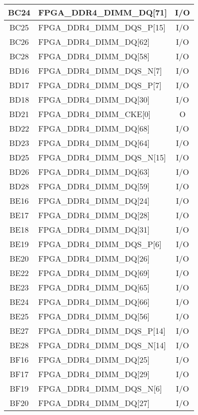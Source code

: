 \begin{longtable}[l]{| c | l | c |}
  BC24 & FPGA\_DDR4\_DIMM\_DQ[71]     & I/O \\ \hline
  BC25 & FPGA\_DDR4\_DIMM\_DQS\_P[15] & I/O \\ \hline
  BC26 & FPGA\_DDR4\_DIMM\_DQ[62]     & I/O \\ \hline
  BC28 & FPGA\_DDR4\_DIMM\_DQ[58]     & I/O \\ \hline
  BD16 & FPGA\_DDR4\_DIMM\_DQS\_N[7]  & I/O \\ \hline
  BD17 & FPGA\_DDR4\_DIMM\_DQS\_P[7]  & I/O \\ \hline
  BD18 & FPGA\_DDR4\_DIMM\_DQ[30]     & I/O \\ \hline
  BD21 & FPGA\_DDR4\_DIMM\_CKE[0]     & O   \\ \hline
  BD22 & FPGA\_DDR4\_DIMM\_DQ[68]     & I/O \\ \hline
  BD23 & FPGA\_DDR4\_DIMM\_DQ[64]     & I/O \\ \hline
  BD25 & FPGA\_DDR4\_DIMM\_DQS\_N[15] & I/O \\ \hline
  BD26 & FPGA\_DDR4\_DIMM\_DQ[63]     & I/O \\ \hline
  BD28 & FPGA\_DDR4\_DIMM\_DQ[59]     & I/O \\ \hline
  BE16 & FPGA\_DDR4\_DIMM\_DQ[24]     & I/O \\ \hline
  BE17 & FPGA\_DDR4\_DIMM\_DQ[28]     & I/O \\ \hline
  BE18 & FPGA\_DDR4\_DIMM\_DQ[31]     & I/O \\ \hline
  BE19 & FPGA\_DDR4\_DIMM\_DQS\_P[6]  & I/O \\ \hline
  BE20 & FPGA\_DDR4\_DIMM\_DQ[26]     & I/O \\ \hline
  BE22 & FPGA\_DDR4\_DIMM\_DQ[69]     & I/O \\ \hline
  BE23 & FPGA\_DDR4\_DIMM\_DQ[65]     & I/O \\ \hline
  BE24 & FPGA\_DDR4\_DIMM\_DQ[66]     & I/O \\ \hline
  BE25 & FPGA\_DDR4\_DIMM\_DQ[56]     & I/O \\ \hline
  BE27 & FPGA\_DDR4\_DIMM\_DQS\_P[14] & I/O \\ \hline
  BE28 & FPGA\_DDR4\_DIMM\_DQS\_N[14] & I/O \\ \hline
  BF16 & FPGA\_DDR4\_DIMM\_DQ[25]     & I/O \\ \hline
  BF17 & FPGA\_DDR4\_DIMM\_DQ[29]     & I/O \\ \hline
  BF19 & FPGA\_DDR4\_DIMM\_DQS\_N[6]  & I/O \\ \hline
  BF20 & FPGA\_DDR4\_DIMM\_DQ[27]     & I/O \\ \hline

\end{longtable}
